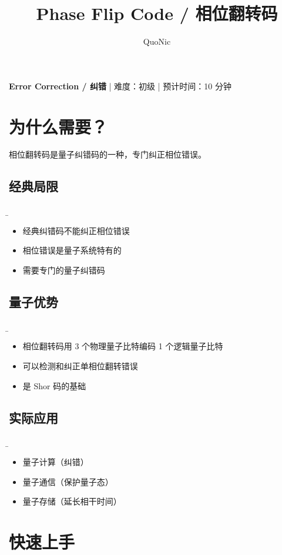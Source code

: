 \documentclass[12pt,a4paper]{article}
\title{Phase Flip Code / 相位翻转码}
\author{QuoNic}
\date{}
\begin{document}
\maketitle

\begin{center}
\textbf{Error Correction / 纠错} | 难度：初级 | 预计时间：10 分钟
\end{center}

\tableofcontents
\newpage

\section{为什么需要？}

相位翻转码是量子纠错码的一种，专门纠正相位错误。

\subsection{经典局限}
\b\begin{itemize}
  \item 经典纠错码不能纠正相位错误
  \item 相位错误是量子系统特有的
  \item 需要专门的量子纠错码
\end{itemize}

\subsection{量子优势}
\b\begin{itemize}
  \item 相位翻转码用 3 个物理量子比特编码 1 个逻辑量子比特
  \item 可以检测和纠正单相位翻转错误
  \item 是 Shor 码的基础
\end{itemize}

\subsection{实际应用}
\b\begin{itemize}
  \item 量子计算（纠错）
  \item 量子通信（保护量子态）
  \item 量子存储（延长相干时间）
\end{itemize}

\section{快速上手}
\end{document}

